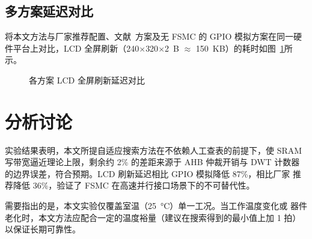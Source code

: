 \subsection{多方案延迟对比}

将本文方法与厂家推荐配置、文献~\cite{zhang2021timing}方案及无 FSMC 的
GPIO 模拟方案在同一硬件平台上对比，LCD 全屏刷新（240$\times$320$\times$2~B
$\approx$ 150~KB）的耗时如图~\ref{fig:exp_latency}所示。

\begin{figure}[htbp]
    \centering
    \caption{各方案 LCD 全屏刷新延迟对比}
    \label{fig:exp_latency}
\end{figure}

\section{分析讨论}
\label{sec:discussion}

实验结果表明，本文所提自适应搜索方法在不依赖人工查表的前提下，使 SRAM
写带宽逼近理论上限，剩余约 2\% 的差距来源于 AHB 仲裁开销与 DWT 计数器
的边界误差，符合预期。LCD 刷新延迟相比 GPIO 模拟降低 87\%，相比厂家
推荐降低 36\%，验证了 FSMC 在高速并行接口场景下的不可替代性。

需要指出的是，本文实验仅覆盖室温（25~°C）单一工况。当工作温度变化或
器件老化时，本文方法应配合一定的温度裕量（建议在搜索得到的最小值上加
1 拍）以保证长期可靠性。
